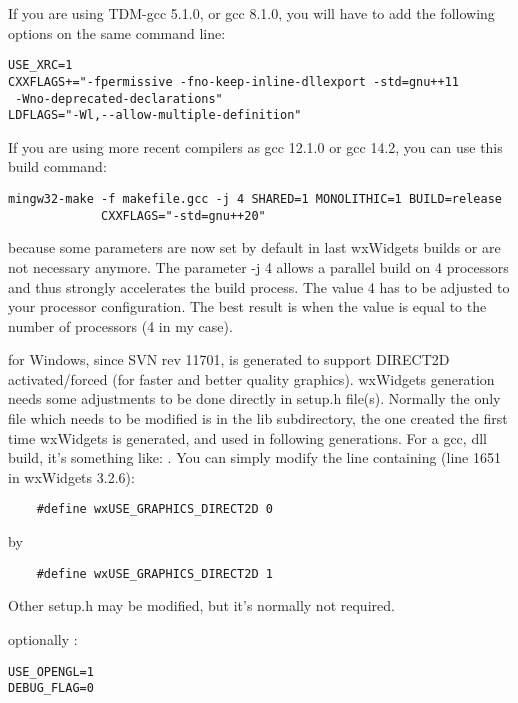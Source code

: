 If you are using TDM-gcc 5.1.0, or gcc 8.1.0, you will have to add the following options on the same command line: 
\begin{verbatim}
USE_XRC=1
CXXFLAGS+="-fpermissive	-fno-keep-inline-dllexport -std=gnu++11
 -Wno-deprecated-declarations"
LDFLAGS="-Wl,--allow-multiple-definition"
\end{verbatim}  

If you are using more recent compilers as gcc 12.1.0 or gcc 14.2, you can use this build command:
\begin{verbatim}
mingw32-make -f makefile.gcc -j 4 SHARED=1 MONOLITHIC=1 BUILD=release
             CXXFLAGS="-std=gnu++20"
\end{verbatim}
because some parameters are now set by default in last wxWidgets builds or are not necessary anymore.\newline
The parameter -j 4 allows a parallel build on 4 processors and thus strongly accelerates the build process. The value 4 has to be adjusted to your processor configuration.
The best result is when the value is equal to the number of processors (4 in my case).

\codeblocks for Windows, since SVN rev 11701, is generated to support DIRECT2D activated/forced (for faster and better quality graphics). wxWidgets generation needs some adjustments to be done directly in setup.h file(s). Normally the only file which needs to be modified is in the lib subdirectory, the one created the first time wxWidgets is generated, and used in following generations. For a gcc, dll build, it's something like:\newline
{}.\newline
You can simply modify the line containing (line 1651 in wxWidgets 3.2.6):
\begin{verbatim}
    #define wxUSE_GRAPHICS_DIRECT2D 0 
\end{verbatim}
by
\begin{verbatim}
    #define wxUSE_GRAPHICS_DIRECT2D 1  
\end{verbatim}
Other setup.h may be modified, but it's normally not required.

optionally :
\begin{verbatim}
USE_OPENGL=1
DEBUG_FLAG=0
\end{verbatim}


